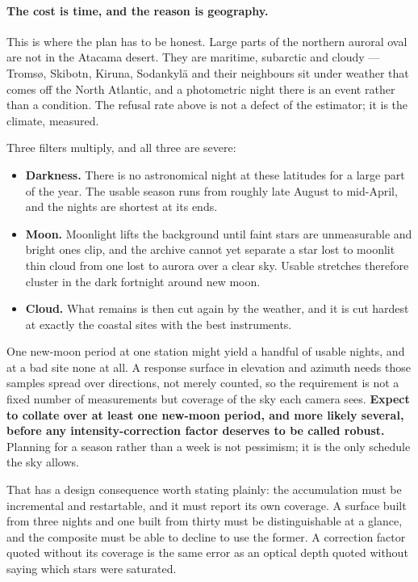 \documentclass[11pt,a4paper]{article}
\begin{document}
\paragraph{The cost is time, and the reason is geography.} This is where the
plan has to be honest. Large parts of the northern auroral oval are not in the
Atacama desert. They are maritime, subarctic and cloudy --- Tromsø, Skibotn,
Kiruna, Sodankylä and their neighbours sit under weather that comes off the
North Atlantic, and a photometric night there is an event rather than a
condition. The refusal rate above is not a defect of the estimator; it is the
climate, measured.

Three filters multiply, and all three are severe:

\begin{itemize}
  \item \textbf{Darkness.} There is no astronomical night at these latitudes
    for a large part of the year. The usable season runs from roughly late
    August to mid-April, and the nights are shortest at its ends.
  \item \textbf{Moon.} Moonlight lifts the background until faint stars are
    unmeasurable and bright ones clip, and the archive cannot yet separate a
    star lost to moonlit thin cloud from one lost to aurora over a clear sky.
    Usable stretches therefore cluster in the dark fortnight around new moon.
  \item \textbf{Cloud.} What remains is then cut again by the weather, and it
    is cut hardest at exactly the coastal sites with the best instruments.
\end{itemize}

One new-moon period at one station might yield a handful of usable nights, and
at a bad site none at all. A response surface in elevation and azimuth needs
those samples spread over directions, not merely counted, so the requirement is
not a fixed number of measurements but coverage of the sky each camera sees.
\textbf{Expect to collate over at least one new-moon period, and more likely
several, before any intensity-correction factor deserves to be called robust.}
Planning for a season rather than a week is not pessimism; it is the only
schedule the sky allows.

That has a design consequence worth stating plainly: the accumulation must be
incremental and restartable, and it must report its own coverage. A surface
built from three nights and one built from thirty must be distinguishable at a
glance, and the composite must be able to decline to use the former. A
correction factor quoted without its coverage is the same error as an optical
depth quoted without saying which stars were saturated.
\end{document}
